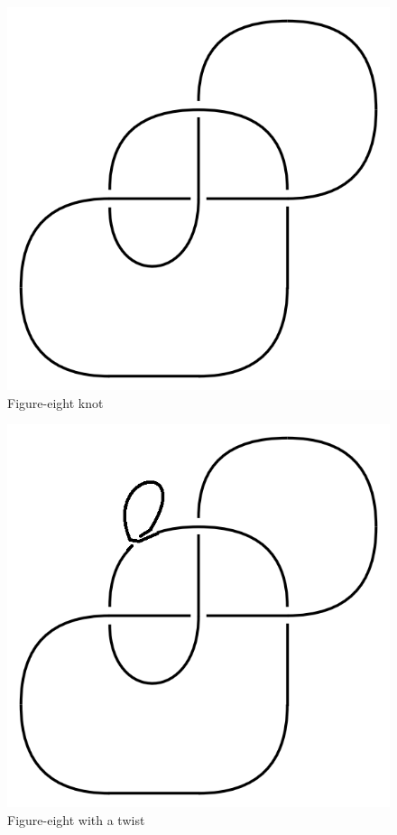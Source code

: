 \documentclass[12pt]{amsart}
\theoremstyle{definition}
\theoremstyle{remark}
\numberwithin{equation}{section}
\newcommand{\ds}{.3}
\begin{document}
\begin{figure}
  \includegraphics[scale=\ds]{figure-eight}
  \caption{Figure-eight knot}
  \label{fig:figure-eight}
\end{figure}

\begin{figure}
  \includegraphics[scale=\ds]{figure-eight-t}
  \caption{Figure-eight with a twist}
  \label{fig:figure-eight-t}
\end{figure}
\end{document}
